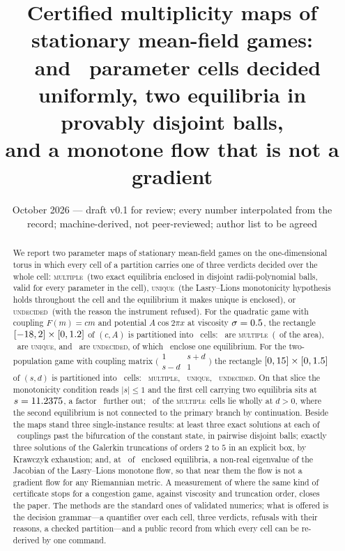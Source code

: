\documentclass[11pt]{article}
\title{Certified multiplicity maps of stationary mean-field games:\\
\OneCells\ and \TwoCells\ parameter cells decided uniformly, two equilibria in provably disjoint balls,\\ and a monotone flow that is not a gradient}
\author{\cmauthor}
\date{October 2026 --- draft v0.1 for review; every number interpolated from the record; machine-derived, not peer-reviewed; author list to be agreed}
\theoremstyle{definition}
\newcommand{\MULT}{\textup{\textsc{multiple}}}
\newcommand{\UNIQ}{\textup{\textsc{unique}}}
\newcommand{\UNDEC}{\textup{\textsc{undecided}}}
\begin{document}
\maketitle

\begin{abstract}
We report two parameter maps of stationary mean-field games on the one-dimensional torus in which every cell of a partition carries one of three verdicts decided over the whole cell: \MULT\ (two exact equilibria enclosed in disjoint radii-polynomial balls, valid for every parameter in the cell), \UNIQ\ (the Lasry--Lions monotonicity hypothesis holds throughout the cell and the equilibrium it makes unique is enclosed), or \UNDEC\ (with the reason the instrument refused). For the quadratic game with coupling $F(m)=cm$ and potential $A\cos2\pi x$ at viscosity $\sigma=0.5$, the rectangle $[-18,2]\times[0,1.2]$ of $(c,A)$ is partitioned into \OneCells\ cells: \OneMult\ are \MULT\ (\OneMultPct\ of the area), \OneUniq\ are \UNIQ, and \OneUnd\ are \UNDEC, of which \OneUndEnclosed\ enclose one equilibrium. For the two-population game with coupling matrix $\bigl(\begin{smallmatrix}1 & s+d\\ s-d & 1\end{smallmatrix}\bigr)$ the rectangle $[0,15]\times[0,1.5]$ of $(s,d)$ is partitioned into \TwoCells\ cells: \TwoMult\ \MULT, \TwoUniq\ \UNIQ, \TwoUnd\ \UNDEC. On that slice the monotonicity condition reads $|s|\le1$ and the first cell carrying two equilibria sits at $s=11.2375$, a factor \TwoGap\ further out; \TwoMultUnreachPct\ of the \MULT\ cells lie wholly at $d>0$, where the second equilibrium is not connected to the primary branch by continuation. Beside the maps stand three single-instance results: at least three exact solutions at each of \MultCount\ couplings past the bifurcation of the constant state, in pairwise disjoint balls; exactly three solutions of the Galerkin truncations of orders $2$ to $5$ in an explicit box, by Krawczyk exhaustion; and, at \MonoDecided\ of \MonoInstances\ enclosed equilibria, a non-real eigenvalue of the Jacobian of the Lasry--Lions monotone flow, so that near them the flow is not a gradient flow for any Riemannian metric. A measurement of where the same kind of certificate stops for a congestion game, against viscosity and truncation order, closes the paper. The methods are the standard ones of validated numerics; what is offered is the decision grammar---a quantifier over each cell, three verdicts, refusals with their reasons, a checked partition---and a public record from which every cell can be re-derived by one command.
\end{abstract}
\end{document}
